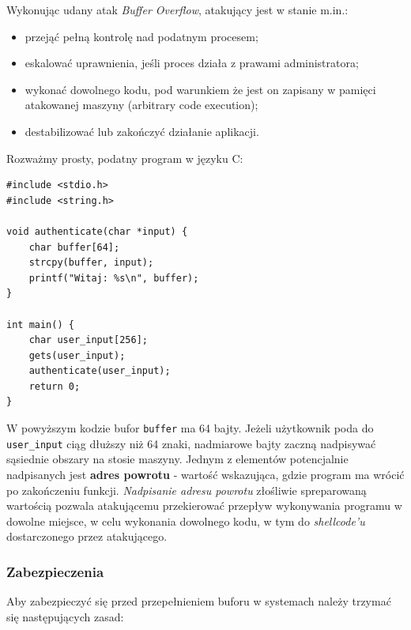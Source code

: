 \documentclass[12pt,a4paper]{article}
\begin{document}
Wykonując udany atak \emph{Buffer Overflow}, atakujący jest w stanie m.in.:
\begin{itemize}
    \item przejąć pełną kontrolę nad podatnym procesem;
    \item eskalować uprawnienia, jeśli proces działa z prawami administratora;
    \item wykonać dowolnego kodu, pod warunkiem że jest on zapisany w pamięci atakowanej maszyny (arbitrary code execution);
    \item destabilizować lub zakończyć działanie aplikacji.
\end{itemize}


Rozważmy prosty, podatny program w języku C:

\begin{tcolorbox}
\begin{verbatim}
#include <stdio.h>
#include <string.h>

void authenticate(char *input) {
    char buffer[64];
    strcpy(buffer, input);
    printf("Witaj: %s\n", buffer);
}

int main() {
    char user_input[256];
    gets(user_input); 
    authenticate(user_input);
    return 0;
}
\end{verbatim}
\end{tcolorbox}

W powyższym kodzie bufor \texttt{buffer} ma 64 bajty. Jeżeli użytkownik poda do \texttt{user\_input} ciąg dłuższy niż 64 znaki, nadmiarowe bajty zaczną nadpisywać sąsiednie obszary na stosie maszyny. 
Jednym z elementów potencjalnie nadpisanych jest \textbf{adres powrotu} - wartość wskazująca, gdzie program ma wrócić po zakończeniu funkcji. \emph{Nadpisanie adresu powrotu} złośliwie spreparowaną 
wartością pozwala atakującemu przekierować przepływ wykonywania programu w dowolne miejsce, w celu wykonania dowolnego kodu, w tym do \emph{shellcode'u} dostarczonego przez atakującego.


\subsubsection{Zabezpieczenia}

Aby zabezpieczyć się przed przepełnieniem buforu w systemach należy trzymać się następujących zasad:
\end{document}
